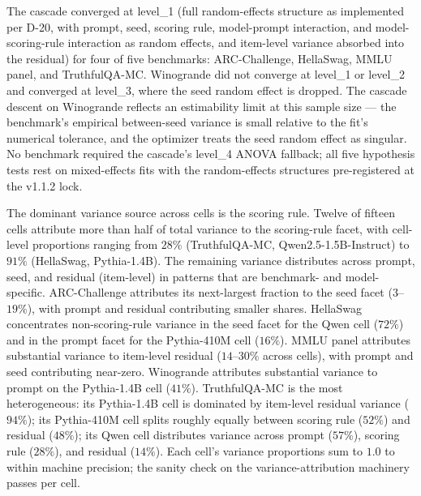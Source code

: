 \documentclass[11pt]{article}
\begin{document}
The cascade converged at level\_1 (full random-effects structure as implemented per D-20, with prompt, seed, scoring rule, model-prompt interaction, and model-scoring-rule interaction as random effects, and item-level variance absorbed into the residual) for four of five benchmarks: ARC-Challenge, HellaSwag, MMLU panel, and TruthfulQA-MC. Winogrande did not converge at level\_1 or level\_2 and converged at level\_3, where the seed random effect is dropped. The cascade descent on Winogrande reflects an estimability limit at this sample size --- the benchmark's empirical between-seed variance is small relative to the fit's numerical tolerance, and the optimizer treats the seed random effect as singular. No benchmark required the cascade's level\_4 ANOVA fallback; all five hypothesis tests rest on mixed-effects fits with the random-effects structures pre-registered at the v1.1.2 lock.

The dominant variance source across cells is the scoring rule. Twelve of fifteen cells attribute more than half of total variance to the scoring-rule facet, with cell-level proportions ranging from $28\%$ (TruthfulQA-MC, Qwen2.5-1.5B-Instruct) to $91\%$ (HellaSwag, Pythia-1.4B). The remaining variance distributes across prompt, seed, and residual (item-level) in patterns that are benchmark- and model-specific. ARC-Challenge attributes its next-largest fraction to the seed facet ($3$--$19\%$), with prompt and residual contributing smaller shares. HellaSwag concentrates non-scoring-rule variance in the seed facet for the Qwen cell ($72\%$) and in the prompt facet for the Pythia-410M cell ($16\%$). MMLU panel attributes substantial variance to item-level residual ($14$--$30\%$ across cells), with prompt and seed contributing near-zero. Winogrande attributes substantial variance to prompt on the Pythia-1.4B cell ($41\%$). TruthfulQA-MC is the most heterogeneous: its Pythia-1.4B cell is dominated by item-level residual variance ($94\%$); its Pythia-410M cell splits roughly equally between scoring rule ($52\%$) and residual ($48\%$); its Qwen cell distributes variance across prompt ($57\%$), scoring rule ($28\%$), and residual ($14\%$). Each cell's variance proportions sum to $1.0$ to within machine precision; the sanity check on the variance-attribution machinery passes per cell.
\end{document}
